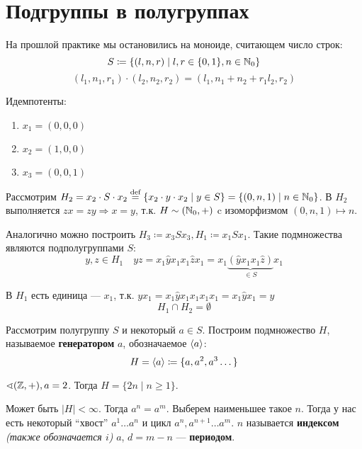 

\cfoot{}



\section*{Подгруппы в полугруппах}

На прошлой практике мы остановились на моноиде, считающем число строк:
\[S \coloneqq \{(l, n, r) \mid l, r \in \{0, 1\}, n \in \mathbb{N}_0\}\]
\[(l_1, n_1, r_1) \cdot (l_2, n_2, r_2) = (l_1, n_1 + n_2 + r_1l_2, r_2)\]

Идемпотенты:
\begin{enumerate}
    \item \(x_1 = (0,0,0)\)
    \item \(x_2 = (1,0,0)\)
    \item \(x_3 = (0,0,1)\)
\end{enumerate}

Рассмотрим \(H_2 = x_2 \cdot S \cdot x_2 \stackrel{\text{def}}{=} \{x_2 \cdot y \cdot x_2 \mid y \in S\} = \{(0, n, 1) \mid n \in \mathbb{N}_0\}\). В \(H_2\) выполняется \(zx = zy \Rightarrow x = y\), т.к. \(H \sim (\mathbb{N}_0, +)\) c изоморфизмом \((0,n,1) \mapsto n\).

Аналогично можно построить \(H_3 \coloneqq x_3 S x_3, H_1 \coloneqq x_1 S x_1\). Такие подмножества являются подполугруппами \(S\):
\[y, z \in H_1 \quad yz = x_1 \hat{y} x_1 x_1 \hat{z} x_1 = x_1 \underbrace{(\hat{y} x_1 x_1 \hat{z})}_{\in S} x_1\]

В \(H_1\) есть единица --- \(x_1\), т.к. \(y x_1 = x_1 \hat{y} x_1 x_1 x_1 x_1 = x_1 \hat{y} x_1 = y\)
\[H_1 \cap H_2 = \emptyset\]

Рассмотрим полугруппу \(S\) и некоторый \(a \in S\). Построим подмножество \(H\), называемое \textbf{генератором} \(a\), обозначаемое \(\ev{a}\):
\[H = \ev{a} \coloneqq \{a, a^2, a^3 \dots \}\]

\begin{example}
    \(\sphericalangle (\mathbb{Z}, +), a = 2\). Тогда \(H = \{2n \mid n \geq 1\}\).
\end{example}

Может быть \(|H| < \infty\). Тогда \(a^n = a^m\). Выберем наименьшее такое \(n\). Тогда у нас есть некоторый ``хвост'' \(a^1 \dots a^n\) и цикл \(a^n, a^{n + 1} \dots a^m\). \(n\) называется \textbf{индексом} \textit{(также обозначается \(i\))} \(a\), \(d = m - n\) --- \textbf{периодом}.

